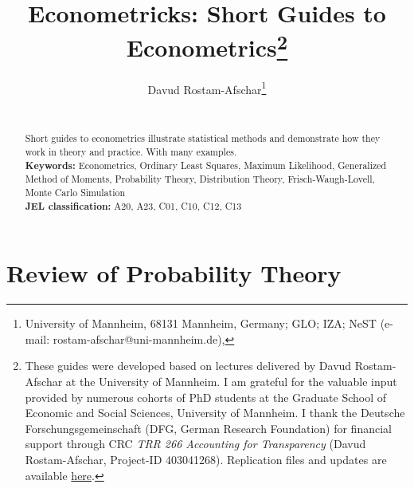 \documentclass[a4paper,12pt]{article}
\begin{document}
\pagebreak
\title{
\huge \hspace{-1pt}Econome\textcolor{red1}{tricks}: Short Guides to Econometrics\thanks{These guides were developed based on lectures delivered by Davud Rostam-Afschar at the University of Mannheim. I am grateful for the valuable input provided by numerous cohorts of PhD students at the Graduate School of Economic and Social Sciences, University of Mannheim. I thank the Deutsche Forschungsgemeinschaft (DFG, German Research Foundation) for financial support through CRC \textit{TRR 266 Accounting for Transparency} (Davud Rostam-Afschar, Project-ID 403041268). Replication files and updates are available \href{https://rostam-afschar.de/metricks/metricks.htm}{here}.}
\\}

\author{
\normalsize\begin{tabular}{c}
Davud Rostam-Afschar\footnote{University of Mannheim, 68131 Mannheim, Germany; GLO; IZA; NeST (e-mail: rostam-afschar@uni-mannheim.de),}\\
{\date{\begin{small}\today\end{small}\\
}
}
\end{tabular}
}
\maketitle

\begin{abstract}
\noindent  Short guides to econometrics illustrate statistical methods and demonstrate how they work in theory and practice. With many examples.\\[2ex]

\noindent\textbf{Keywords:} Econometrics, Ordinary Least Squares, Maximum Likelihood, Generalized Method of Moments, Probability Theory, Distribution Theory, Frisch-Waugh-Lovell, Monte Carlo Simulation\\
\noindent \textbf{JEL classification:} A20, A23, C01, C10, C12, C13
\vfill
\end{abstract}

\newpage
	\tableofcontents
\newpage
\section{Review of Probability Theory}
\end{document}
